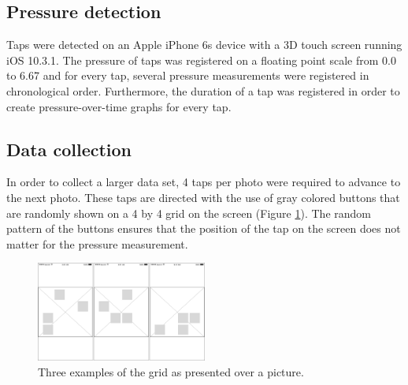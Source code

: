 \documentclass{sig-alternate}
\begin{document}

\subsection{Pressure detection} %
\label{sub:pressure_detection}
Taps were detected on an Apple iPhone 6s device with a 3D touch screen running iOS 10.3.1. The pressure of taps was registered on a floating point scale from 0.0 to 6.67 and for every tap, several pressure measurements were registered in chronological order. Furthermore, the duration of a tap was registered in order to create pressure-over-time graphs for every tap.

\subsection{Data collection} %
\label{sub:data_collection}
In order to collect a larger data set, 4 taps per photo were required to advance to the next photo. These taps are directed with the use of gray colored buttons that are randomly shown on a 4 by 4 grid on the screen (Figure \ref{fig:grid}). The random pattern of the buttons ensures that the position of the tap on the screen does not matter for the pressure measurement.
\begin{figure}[h]
    \centering
    \includegraphics[width=0.5\textwidth]{images/Grid.png}
    \caption{Three examples of the grid as presented over a picture.}
    \label{fig:grid}
\end{figure}
\end{document}
